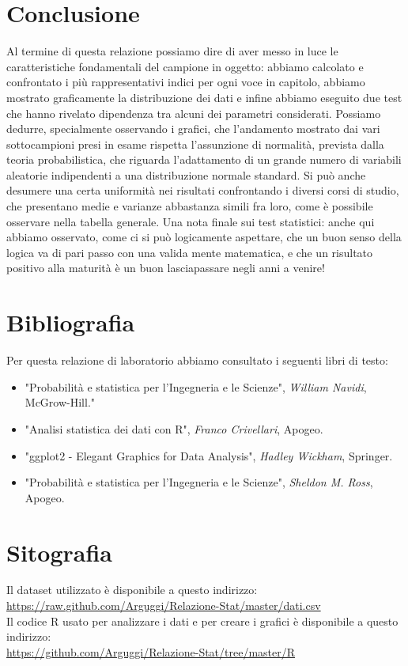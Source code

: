 \clearpage
\section{Conclusione}
Al termine di questa relazione possiamo dire di aver messo in luce le caratteristiche fondamentali del campione in oggetto: abbiamo calcolato e confrontato i più rappresentativi indici per ogni voce in capitolo, abbiamo mostrato graficamente la distribuzione dei dati e infine abbiamo eseguito due test che hanno rivelato dipendenza tra alcuni dei parametri considerati.
Possiamo dedurre, specialmente osservando i grafici, che l’andamento mostrato dai vari sottocampioni presi in esame rispetta l’assunzione di normalità, prevista dalla teoria probabilistica, che riguarda l’adattamento di un grande numero di variabili aleatorie indipendenti a una distribuzione normale standard.  
Si può anche desumere una certa uniformità nei risultati confrontando i diversi corsi di studio, che presentano medie e varianze abbastanza simili fra loro, come è possibile osservare nella tabella generale.
Una nota finale sui test statistici: anche qui abbiamo osservato, come ci si può logicamente aspettare, che un buon senso della logica va di pari passo con una valida mente matematica, e che un risultato positivo alla maturità è un buon lasciapassare negli anni a venire!
\clearpage

\section{Bibliografia}
Per questa relazione di laboratorio abbiamo consultato i seguenti libri di testo:
\begin{itemize}
  \item "Probabilità e statistica per l’Ingegneria e le Scienze", \textit{William Navidi}, McGrow-Hill."
  \item "Analisi statistica dei dati con R", \textit{Franco Crivellari}, Apogeo.
  \item "ggplot2 - Elegant Graphics for Data Analysis", \textit{Hadley Wickham}, Springer.
  \item "Probabilità e statistica per l’Ingegneria e le Scienze", \textit{Sheldon M. Ross}, Apogeo.
\end{itemize}

\section{Sitografia}

Il dataset utilizzato è disponibile a questo indirizzo:
\url{https://raw.github.com/Arguggi/Relazione-Stat/master/dati.csv}\\

\noindent Il codice R usato per analizzare i dati e per creare i grafici è disponibile a questo indirizzo: \\
\url{https://github.com/Arguggi/Relazione-Stat/tree/master/R}
